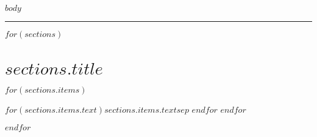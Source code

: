 \documentclass[11pt,a4paper]{scrartcl}
\begin{document}
$body$

{\color{AccentColor}\rule{\linewidth}{0.5mm}}

$for(sections)$
\section*{$sections.title$}

\begin{description}

$for(sections.items)$
\item [$if(sections.items.label)$$sections.items.label$$endif$] $for(sections.items.text)$$sections.items.text$$sep$ \newline $endfor$ 
$endfor$

\end{description}
$endfor$
\end{document}
